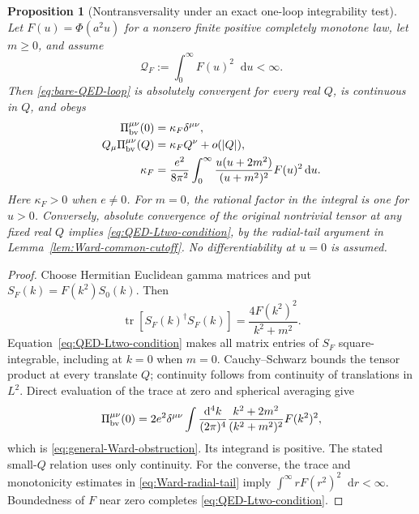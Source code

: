\documentclass[final,5p,times,twocolumn,numbers,nopreprintline]{elsarticle}
\numberwithin{equation}{section}
\newtheorem{proposition}[theorem]{Proposition}
\theoremstyle{definition}
\theoremstyle{remark}
\newcommand{\dd}{\mathop{}\!\mathrm d}
\newcommand{\Ph}{\Phi}
\begin{document}
\begin{proposition}[Nontransversality under an exact one-loop integrability test]
\label{prop:QED-general-obstruction}
Let \(F(u)=\Ph(a^2u)\) for a nonzero finite positive completely
monotone law, let \(m\geq0\), and assume
\begin{equation}
 \mathcal Q_F:=\int_0^\infty F(u)^2\dd u<\infty.
 \label{eq:QED-Ltwo-condition}
\end{equation}
Then \eqref{eq:bare-QED-loop} is absolutely convergent for every
real \(Q\), is continuous in \(Q\), and obeys
\begin{equation}
\begin{aligned}
 \Pi_{\rm bv}^{\mu\nu}(0)&=\kappa_F\delta^{\mu\nu},\\
 Q_\mu\Pi_{\rm bv}^{\mu\nu}(Q)
      &=\kappa_F Q^\nu+o(|Q|),\\
 \kappa_F
 &=\frac{e^2}{8\pi^2}\int_0^\infty
     \frac{u(u+2m^2)}{(u+m^2)^2}F(u)^2\dd u.
\end{aligned}
 \label{eq:general-Ward-obstruction}
\end{equation}
Here \(\kappa_F>0\) when \(e\ne0\).
For \(m=0\), the rational factor in the integral is one for
\(u>0\). Conversely, absolute convergence of the original
nontrivial tensor at any fixed real \(Q\) implies
\eqref{eq:QED-Ltwo-condition}, by the radial-tail argument in
Lemma~\ref{lem:Ward-common-cutoff}. No differentiability at
\(u=0\) is assumed.
\end{proposition}

\begin{proof}
Choose Hermitian Euclidean gamma matrices and put
\(S_F(k)=F(k^2)S_0(k)\). Then
\[
 \operatorname{tr}[S_F(k)^\dagger S_F(k)]
       =\frac{4F(k^2)^2}{k^2+m^2}.
\]
Equation~\eqref{eq:QED-Ltwo-condition} makes all matrix entries
of \(S_F\) square-integrable, including at \(k=0\) when
\(m=0\). Cauchy--Schwarz bounds the tensor product at every
translate \(Q\); continuity follows from continuity of
translations in \(L^2\). Direct evaluation of the trace at zero
and spherical averaging give
\[
 \Pi_{\rm bv}^{\mu\nu}(0)
 =2e^2\delta^{\mu\nu}\int\frac{\dd^4k}{(2\pi)^4}
          \frac{k^2+2m^2}{(k^2+m^2)^2}F(k^2)^2,
\]
which is \eqref{eq:general-Ward-obstruction}. Its integrand is
positive. The stated small-\(Q\) relation uses only continuity.
For the converse, the trace and monotonicity estimates in
\eqref{eq:Ward-radial-tail} imply
\(\int^\infty rF(r^2)^2\dd r<\infty\). Boundedness of
\(F\) near zero completes \eqref{eq:QED-Ltwo-condition}.
\end{proof}
\end{document}
